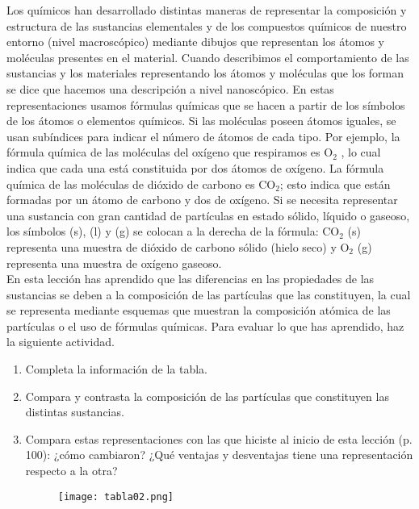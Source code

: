 Los químicos han desarrollado distintas maneras de representar la composición y
estructura de las sustancias elementales y de los compuestos químicos de nuestro
entorno (nivel macroscópico) mediante dibujos que representan los átomos y moléculas presentes en el material.
Cuando describimos el comportamiento de las sustancias
y los materiales representando los átomos y moléculas que los forman se dice que
hacemos una descripción a nivel nanoscópico.
En estas representaciones usamos fórmulas químicas que se hacen a partir de los
símbolos de los átomos o elementos químicos. Si las moléculas poseen átomos iguales,
se usan subíndices para indicar el número de átomos de cada tipo. Por ejemplo, la
fórmula química de las moléculas del oxígeno que respiramos es O$_2$ , lo cual indica que
cada una está constituida por dos átomos de oxígeno. La fórmula química de las moléculas de dióxido de carbono es CO$_2$;
esto indica que están formadas por un átomo de
carbono y dos de oxígeno. Si se necesita representar una sustancia con gran cantidad
de partículas en estado sólido, líquido o gaseoso, los símbolos (s), (l) y (g) se colocan a
la derecha de la fórmula: CO$_2$ (s) representa una muestra de dióxido de carbono sólido
(hielo seco) y O$_2$ (g) representa una muestra de oxígeno gaseoso.\\

En esta lección has aprendido que las diferencias en las propiedades de las sustancias
se deben a la composición de las partículas que las constituyen, la cual se representa
mediante esquemas que muestran la composición atómica de las partículas o el uso
de fórmulas químicas. Para evaluar lo que has aprendido, haz la siguiente actividad.

\newpage
\begin{landscape}
    \thispagestyle{plain}
    \begin{figure}[H]
        \TablaPeriodica[0.48]
        \label{tab:periodic_table}
    \end{figure}
\end{landscape}

\newpage
\begin{boxK}
    \begin{enumerate}
        \item Completa la información de la tabla.
        \item Compara y contrasta la composición de las partículas que constituyen las distintas sustancias.
        \item Compara estas representaciones con las que hiciste al inicio de esta lección
              (p. 100): ¿cómo cambiaron? ¿Qué ventajas y desventajas tiene una representación respecto a la otra?
              \begin{figure}[H]
                  \centering
                  \texttt{[image: tabla02.png]}
              \end{figure}

    \end{enumerate}
\end{boxK}

